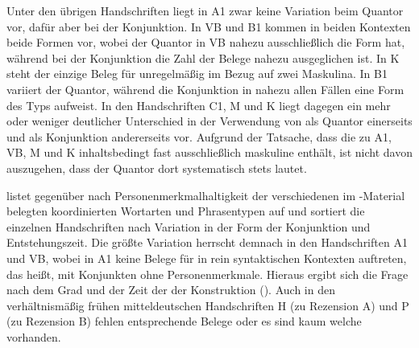 Unter den übrigen Handschriften liegt in A1 zwar keine Variation beim Quantor
vor, dafür aber bei der Konjunktion. In VB und B1 kommen in beiden Kontexten
beide Formen vor, wobei der Quantor in VB nahezu ausschließlich die Form
 hat, während bei der Konjunktion die Zahl der Belege nahezu
ausgeglichen ist. In K steht der einzige Beleg für 
unregelmäßig im Bezug auf zwei Maskulina. In B1 variiert der
Quantor, während die Konjunktion in nahezu allen Fällen eine Form des Typs
 aufweist. In den Handschriften C1, M und K liegt dagegen ein mehr
oder weniger deutlicher Unterschied in der Verwendung von  als
Quantor einerseits und  als Konjunktion andererseits vor. Aufgrund
der Tatsache, dass die  zu A1, VB, M und K inhaltsbedingt fast
ausschließlich maskuline  enthält, ist nicht davon auszugehen,
dass der Quantor dort systematisch stets  lautet.

 listet  gegenüber  nach
Personenmerkmalhaltigkeit der verschiedenen im
\KC{}-Material belegten koordinierten Wortarten und Phrasentypen auf und
sortiert die einzelnen Handschriften nach Variation in der Form der Konjunktion
und Entstehungszeit. Die größte Varia\-tion herrscht demnach in den
Handschriften A1 und VB, wobei in A1 keine Belege für 
in rein syntaktischen Kontexten auftreten, das heißt, mit Konjunkten ohne
Personen\-merkmale. Hieraus ergibt sich die Frage nach dem Grad und der Zeit
der  der Konstruktion (). Auch
in den verhältnismäßig frühen mitteldeutschen Handschriften H
(zu Rezension A) und P (zu Rezension B) fehlen entsprechende Belege oder es
sind kaum welche vorhanden.

